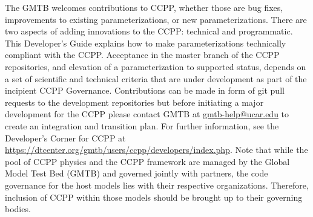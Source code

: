The GMTB welcomes contributions to CCPP, whether those are bug fixes, improvements to existing parameterizations, or new parameterizations. There are two aspects of adding innovations to the CCPP: technical and programmatic. This Developer's Guide explains how to make parameterizations technically compliant with the CCPP. Acceptance in the master branch of the CCPP repositories, and elevation of a parameterization to supported status, depends on a set of scientific and technical criteria that are under development as part of the incipient CCPP Governance. Contributions can be made in form of git pull requests to the development repositories but before initiating a major development for the CCPP please contact GMTB at \url{gmtb-help@ucar.edu} to create an integration and transition plan. For further information, see the Developer's Corner for CCPP at \url{https://dtcenter.org/gmtb/users/ccpp/developers/index.php}. Note that while the pool of CCPP physics and the CCPP framework are managed by the Global Model Test Bed (GMTB) and governed jointly with partners, the code governance for the host models lies with their respective organizations. Therefore, inclusion of CCPP within those models should be brought up to their governing bodies.